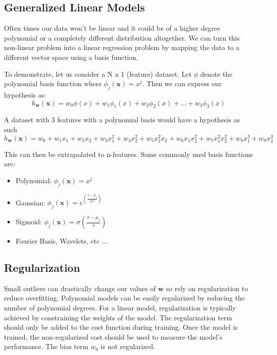 \documentclass[12pt]{article}
\begin{document}
    \subsection{Generalized Linear Models}
        Often times our data won't be linear and it could be of a higher degree polynomial or a completely different distribution altogether. We can turn this non-linear problem into 
        a linear regression problem by mapping the data to a different vector space using a basis function.

        To demonstrate, let us consider a N x 1 (feature) dataset. Let $\phi$ denote the polynomial basis function where
        $\phi_j(\boldsymbol{x}) = x^j$. Then we can express our hypothesis as: 
        $$ h_{\boldsymbol{w}}(\boldsymbol{x}) = w_0\phi(x) + w_1\phi_1(x) + w_2\phi_2(x) + ... + w_3\phi_3(x) $$

        A dataset with 3 features with a polynomial basis would have a hypothesis as such
        $$ h_{\boldsymbol{w}}(\boldsymbol{x}) = w_0 + w_1x_1 + w_2x_2 + w_3x_1^2 + w_4x_2^2 + w_5x_1^2x_2 + w_6x_1x_2^2 + w_7x_1^2x_2^2 + w_8x_1^3 + w_9x_2^3 $$

        This can then be extrapolated to n-features. Some commonly used basis functions are:

        \begin{itemize}
            \item Polynomial: $\phi_j(\boldsymbol{x}) = x^j$
            \item Gaussian: $\phi_j(\boldsymbol{x}) = e^{(\frac{x-\mu_j}{2s^2})}$
            \item Sigmoid: $\phi_j(\boldsymbol{x}) = \sigma{(\frac{x-\mu_j}{s})}$
            \item Fourier Basis, Wavelets, etc ...
        \end{itemize}

    \subsection{Regularization}
        Small outliers can drastically change our values of $\boldsymbol{w}$ so rely on regularization to reduce overfitting. Polynomial models can be easily regularized
        by reducing the number of polynomial degrees. For a linear model, regularization is typically achieved by constraining the weights of the model. The regularization term should only
        be added to the cost function during training. Once the model is trained, the non-regularized cost should be used to measure the model's performance. The bias term $w_0$ is not regularized.
\end{document}
